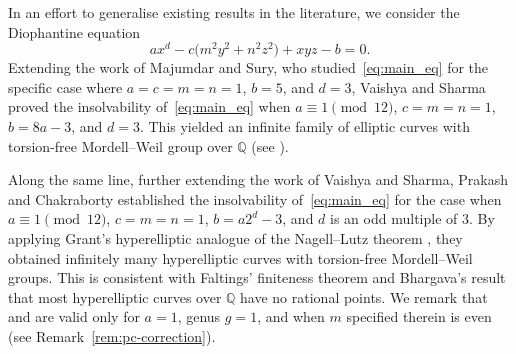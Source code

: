 \documentclass[11pt,a4paper]{amsart}
\newcommand{\Q}{\mathbb{Q}}
\theoremstyle{plain}
\theoremstyle{definition}
\begin{document}
In an effort to generalise existing results in the literature, we consider the Diophantine equation
\begin{equation}\label{eq:main_eq}
  ax^{d} - c\bigl(m^{2}y^{2} + n^{2}z^{2}\bigr) + xyz - b = 0.
\end{equation}
Extending the work of Majumdar and Sury, who studied~\eqref{eq:main_eq} for the specific case where $a=c=m=n=1$, $b=5$, and $d=3$, Vaishya and Sharma \cite{VaishyaSharma} proved the insolvability of~\eqref{eq:main_eq} when $a \equiv 1 \pmod{12}$, $c = m = n = 1$, $b = 8a - 3$, and $d=3$. This yielded an infinite family of elliptic curves with torsion-free Mordell--Weil group over $\Q$ (see \cite[Corollary~1.4]{VaishyaSharma}).

Along the same line, further extending the work of Vaishya and Sharma, Prakash and Chakraborty \cite{PrakashChakraborty} established the insolvability of~\eqref{eq:main_eq} for the case when $a \equiv 1 \pmod{12}$, $c = m = n = 1$, $b = a2^d - 3$, and $d$ is an odd multiple of $3$. By applying Grant's hyperelliptic analogue of the Nagell--Lutz theorem \cite{Grant}, they obtained infinitely many hyperelliptic curves with torsion-free Mordell--Weil groups. This is consistent with Faltings' finiteness theorem \cite{Faltings1983} and Bhargava's result \cite{Bhargava2013} that most hyperelliptic curves over $\Q$ have no rational points. We remark that \cite[Theorem~3.3]{PrakashChakraborty} and \cite[Theorem~1.2]{VaishyaSharma} are valid only for $a = 1$, genus $g=1$, and when $m$ specified therein is even (see Remark~\ref{rem:pc-correction}).
\end{document}
